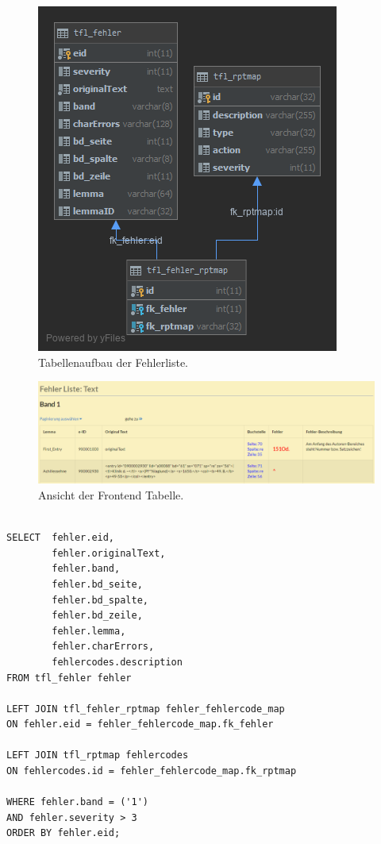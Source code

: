 \begin{figure}
	\centering
	\includegraphics[width=0.5\linewidth]{images/structure_errormodule.png}
	\caption{Tabellenaufbau der Fehlerliste.}
	\label{img:errorListStructure}
\end{figure}

\begin{figure}
	\centering
	\includegraphics[width=1\linewidth]{images/errormodule_sample.png}
	\caption{Ansicht der Frontend Tabelle.}
	\label{img:errorListSample}
\end{figure}

\lstset{language=SQL}
\begin{lstlisting}[frame=single]  % Start your code-block

SELECT  fehler.eid,
        fehler.originalText,
        fehler.band,
        fehler.bd_seite,
        fehler.bd_spalte,
        fehler.bd_zeile,
        fehler.lemma,
        fehler.charErrors,
        fehlercodes.description
FROM tfl_fehler fehler

LEFT JOIN tfl_fehler_rptmap fehler_fehlercode_map 
ON fehler.eid = fehler_fehlercode_map.fk_fehler

LEFT JOIN tfl_rptmap fehlercodes 
ON fehlercodes.id = fehler_fehlercode_map.fk_rptmap

WHERE fehler.band = ('1')
AND fehler.severity > 3
ORDER BY fehler.eid;
\end{lstlisting}


